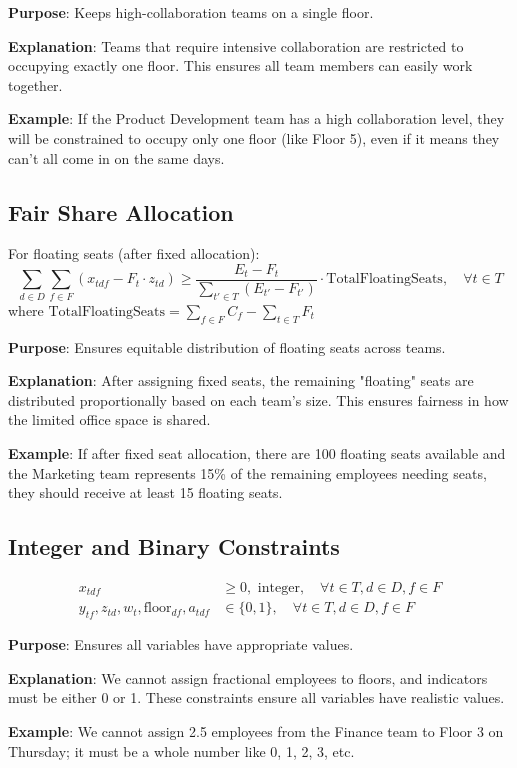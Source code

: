 \documentclass[12pt]{article}
\begin{document}
\textbf{Purpose}: Keeps high-collaboration teams on a single floor.

\textbf{Explanation}: Teams that require intensive collaboration are restricted to occupying exactly one floor. This ensures all team members can easily work together.

\textbf{Example}: If the Product Development team has a high collaboration level, they will be constrained to occupy only one floor (like Floor 5), even if it means they can't all come in on the same days.

\subsection{Fair Share Allocation}
For floating seats (after fixed allocation):
\begin{equation}
\sum_{d \in D} \sum_{f \in F} (x_{tdf} - F_t \cdot z_{td}) \geq \frac{E_t - F_t}{\sum_{t' \in T} (E_{t'} - F_{t'})} \cdot \text{TotalFloatingSeats}, \quad \forall t \in T
\end{equation}
where $\text{TotalFloatingSeats} = \sum_{f \in F} C_f - \sum_{t \in T} F_t$

\textbf{Purpose}: Ensures equitable distribution of floating seats across teams.

\textbf{Explanation}: After assigning fixed seats, the remaining "floating" seats are distributed proportionally based on each team's size. This ensures fairness in how the limited office space is shared.

\textbf{Example}: If after fixed seat allocation, there are 100 floating seats available and the Marketing team represents 15\% of the remaining employees needing seats, they should receive at least 15 floating seats.

\subsection{Integer and Binary Constraints}
\begin{align}
x_{tdf} &\geq 0, \text{ integer}, \quad \forall t \in T, d \in D, f \in F\\
y_{tf}, z_{td}, w_t, \text{floor}_{df}, a_{tdf} &\in \{0, 1\}, \quad \forall t \in T, d \in D, f \in F
\end{align}

\textbf{Purpose}: Ensures all variables have appropriate values.

\textbf{Explanation}: We cannot assign fractional employees to floors, and indicators must be either 0 or 1. These constraints ensure all variables have realistic values.

\textbf{Example}: We cannot assign 2.5 employees from the Finance team to Floor 3 on Thursday; it must be a whole number like 0, 1, 2, 3, etc.
\end{document}
